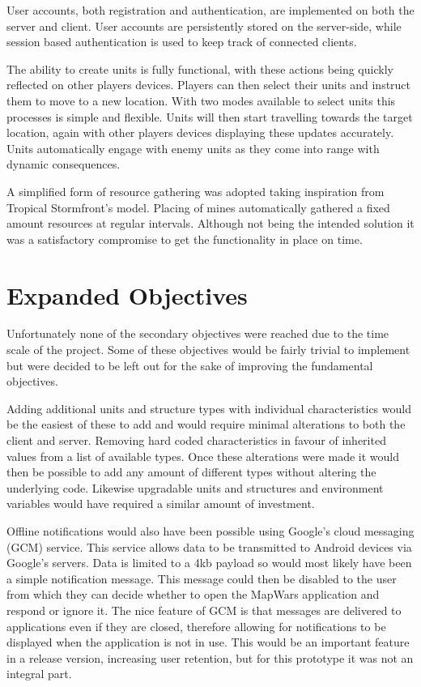 User accounts, both registration and authentication, are implemented on both the server and client. User accounts are persistently stored on the server-side, while session based authentication is used to keep track of connected clients.

The ability to create units is fully functional, with these actions being quickly reflected on other players devices. Players can then select their units and instruct them to move to a new location. With two modes available to select units this processes is simple and flexible. Units will then start travelling towards the target location, again with other players devices displaying these updates accurately. Units automatically engage with enemy units as they come into range with dynamic consequences.

A simplified form of resource gathering was adopted taking inspiration from Tropical Stormfront's model. Placing of mines automatically gathered a fixed amount resources at regular intervals. Although not being the intended solution it was a satisfactory compromise to get the functionality in place on time.

\section{Expanded Objectives}
Unfortunately none of the secondary objectives were reached due to the time scale of the project. Some of these objectives would be fairly trivial to implement but were decided to be left out for the sake of improving the fundamental objectives.

Adding additional units and structure types with individual characteristics would be the easiest of these to add and would require minimal alterations to both the client and server. Removing hard coded characteristics in favour of inherited values from a list of available types. Once these alterations were made it would then be possible to add any amount of different types without altering the underlying code. Likewise upgradable units and structures and environment variables would have required a similar amount of investment.

Offline notifications would also have been possible using Google's cloud messaging (GCM) service\cite{gcm}. This service allows data to be transmitted to Android devices via Google's servers. Data is limited to a 4kb payload so would most likely have been a simple notification message. This message could then be disabled to the user from which they can decide whether to open the MapWars application and respond or ignore it. The nice feature of GCM is that messages are delivered to applications even if they are closed, therefore allowing for notifications to be displayed when the application is not in use. This would be an important feature in a release version, increasing user retention, but for this prototype it was not an integral part.

